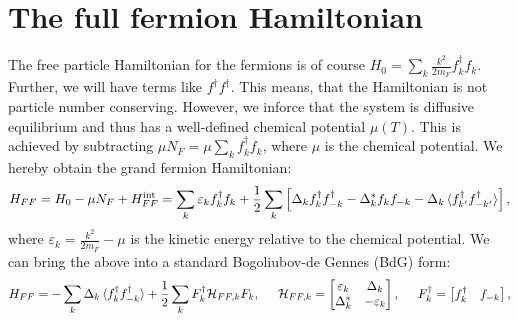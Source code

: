 \section{The full fermion Hamiltonian} \label{sec.HFFfull}
The free particle Hamiltonian for the fermions is of course $H_0 = \sum_k \frac{k^2}{2m_F} f^\dagger_k f_k$. Further, we will have terms like $f^\dagger f^\dagger$. This means, that the Hamiltonian is not particle number conserving. However, we inforce that the system is diffusive equilibrium and thus has a well-defined chemical potential $\mu(T)$. This is achieved by subtracting $\mu N_F = \mu \sum_k f^\dagger_k f_k$, where $\mu$ is the chemical potential. We hereby obtain the grand fermion Hamiltonian:
\begin{equation}
H_{FF} = H_0-\mu N_F + H^\text{int}_{FF} = \sum_k \varepsilon_k f^\dagger_k f_k + \frac{1}{2}\sum_{k} \left[ \Delta_k f^\dagger_k f^\dagger_{-k} - \Delta^*_k f_k f_{-k} - \Delta_k \braket {f^\dagger_{k'}f^\dagger_{-k'}} \right], 
\label{eq.HFFdef}
\end{equation} 
where $\varepsilon_k = \frac{k^2}{2m_F}-\mu$ is the kinetic energy relative to the chemical potential. We can bring the above into a standard Bogoliubov-de Gennes (BdG) form:
\begin{equation}
H_{FF} = -\sum_k \Delta_k \braket {f^\dagger_k f^\dagger_{-k}} + \frac{1}{2}\sum_{k} F_k^\dagger \mathcal{H}_{FF,k} F_k, \hspace{0.5cm} \mathcal{H}_{FF,k} = \begin{bmatrix} \varepsilon_k & \Delta_k \\ \Delta^*_k & -\varepsilon_k \end{bmatrix}, \hspace{0.5cm} F^\dagger_k = \begin{bmatrix} f_k^\dagger & f_{-k} \end{bmatrix}, 
\end{equation}

